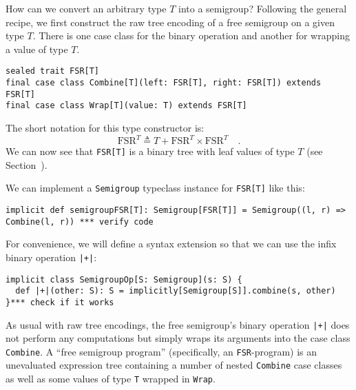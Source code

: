 How can we convert an arbitrary type $T$ into a semigroup? Following
the general recipe, we first construct the raw tree encoding of a
free semigroup on a given type $T$. There is one case class for the
binary operation and another for wrapping a value of type $T$.
\begin{lstlisting}
sealed trait FSR[T]
final case class Combine[T](left: FSR[T], right: FSR[T]) extends FSR[T]
final case class Wrap[T](value: T) extends FSR[T]
\end{lstlisting}
The short notation for this type constructor is:
\[
\text{FSR}^{T}\triangleq T+\text{FSR}^{T}\times\text{FSR}^{T}\quad.
\]
We can now see that \lstinline!FSR[T]!
is a binary tree with leaf values of type $T$ (see Section~).

We can implement a \lstinline!Semigroup!
typeclass instance for \lstinline!FSR[T]!
like this:
\begin{lstlisting}
implicit def semigroupFSR[T]: Semigroup[FSR[T]] = Semigroup((l, r) => Combine(l, r)) *** verify code
\end{lstlisting}
For convenience, we will define a syntax extension so that we can
use the infix binary operation \lstinline!|+|!:
\begin{lstlisting}
implicit class SemigroupOp[S: Semigroup](s: S) {
  def |+|(other: S): S = implicitly[Semigroup[S]].combine(s, other)
}*** check if it works
\end{lstlisting}
As usual with raw tree encodings, the free semigroup\textsf{'}s binary operation
\lstinline!|+|! does not
perform any computations but simply wraps its arguments into the case
class \lstinline!Combine!.
A \textsf{``}free semigroup program\textsf{''} (specifically, an \lstinline!FSR!-program)
is an unevaluated expression tree containing a number of nested \lstinline!Combine!
case classes as well as some values of type \lstinline!T!
wrapped in \lstinline!Wrap!. 

